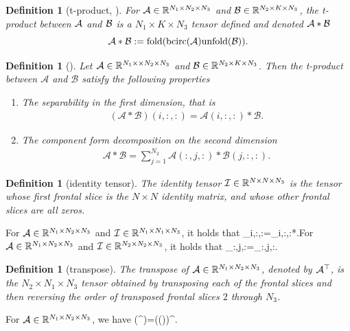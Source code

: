 \documentclass[11pt]{article}
\newtheorem{definition}[theorem]{Definition}
\def\fm#1{\mathcal{#1}}
\def\r{\mathbb{R}}
\begin{document}
\begin{definition}[t-product, \cite{kilmer2011facto, kilmer2013thirdOrder}]
For $\mathcal A\in\mathbb R^{N_1\times N_2\times N_3}$ and $\mathcal B\in\mathbb R^{N_2\times K\times N_3}$, the {\it t-product} between $\mathcal A$ and $\mathcal B $ is  a $ N_1\times K\times N_3$ tensor  defined and denoted  $\mathcal A*\mathcal B$ 
$$
\mathcal A*\mathcal B:={\rm fold}({\rm bcirc}(\mathcal A){\rm unfold}(\mathcal B)).
$$	
\end{definition}

\begin{definition}[\cite{kilmer2011facto, kilmer2013thirdOrder}]
Let $\mcala \in \r^{N_1\times \times N_2 \times N_3}$ and $\mcalb \in \r^{N_2\times K\times N_3}$. Then the t-product between $\fm A $ and $\fm B$ satisfy the following properties
\begin{enumerate}
    \item The separability in the first dimension, that is 
    \begin{align*}
        \left( \fm A * \fm B\right)(i, :, :) = \fm A(i, :, :) * \fm B.
    \end{align*}
    \item  The component form decomposition on the second dimension
    \begin{align}
        \fm A * \fm B = \sum_{j=1}^{N_2} \fm A(:, j, :) * \fm B (j, :, :).
    \end{align}
\end{enumerate}
\end{definition}

\begin{definition}[identity tensor]
 The identity tensor $\mathcal I\in\mathbb R^{N\times N\times N_3}$ is the tensor whose first frontal slice is the $N\times N$ identity matrix, and whose other frontal slices are all zeros.	
\end{definition}
For $\mathcal A\in\mathbb R^{N_1\times N_2\times N_3}$ and $\mathcal I\in\mathbb R^{N_1\times N_1\times N_3}$, it holds that \beq\label{ii}\mcala_{i,:,:}=\mcali_{i,:,:}*\mcala.\eeq For $\mathcal A\in\mathbb R^{N_1\times N_2\times N_3}$ and $\mathcal I\in\mathbb R^{N_2\times N_2\times N_3}$, it holds that \beq\label{ij}\mcala_{:,j,:}=\mcala*\mcali_{:,j,:}.\eeq

\begin{definition}[transpose]
The transpose of $\mathcal A\in\mathbb R^{N_1\times N_2\times N_3}$, denoted by $\mathcal A^\top$, is the $N_2\times N_1\times N_3$ tensor obtained by transposing each of the frontal slices and then reversing the order of transposed frontal slices $2$ through $N_3$.
\end{definition} 
For $\mathcal A\in\mathbb R^{N_1\times N_2\times N_3}$, we have  \beq\label{ttop}\bcirc(\mcala^\top)=(\bcirc(\mcala))^\top.\eeq %
   
\end{document}
